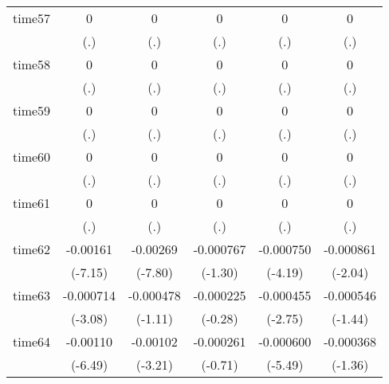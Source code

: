 \begin{table}[htbp]
\begin{tabular}{l*{5}{c}}
time57      &           0         &           0         &           0         &           0         &           0         \\
            &         (.)         &         (.)         &         (.)         &         (.)         &         (.)         \\
time58      &           0         &           0         &           0         &           0         &           0         \\
            &         (.)         &         (.)         &         (.)         &         (.)         &         (.)         \\
time59      &           0         &           0         &           0         &           0         &           0         \\
            &         (.)         &         (.)         &         (.)         &         (.)         &         (.)         \\
time60      &           0         &           0         &           0         &           0         &           0         \\
            &         (.)         &         (.)         &         (.)         &         (.)         &         (.)         \\
time61      &           0         &           0         &           0         &           0         &           0         \\
            &         (.)         &         (.)         &         (.)         &         (.)         &         (.)         \\
time62      &    -0.00161\sym{***}&    -0.00269\sym{***}&   -0.000767         &   -0.000750\sym{***}&   -0.000861\sym{*}  \\
            &     (-7.15)         &     (-7.80)         &     (-1.30)         &     (-4.19)         &     (-2.04)         \\
time63      &   -0.000714\sym{**} &   -0.000478         &   -0.000225         &   -0.000455\sym{**} &   -0.000546         \\
            &     (-3.08)         &     (-1.11)         &     (-0.28)         &     (-2.75)         &     (-1.44)         \\
time64      &    -0.00110\sym{***}&    -0.00102\sym{**} &   -0.000261         &   -0.000600\sym{***}&   -0.000368         \\
            &     (-6.49)         &     (-3.21)         &     (-0.71)         &     (-5.49)         &     (-1.36)         \\

\end{tabular}
\end{table}
